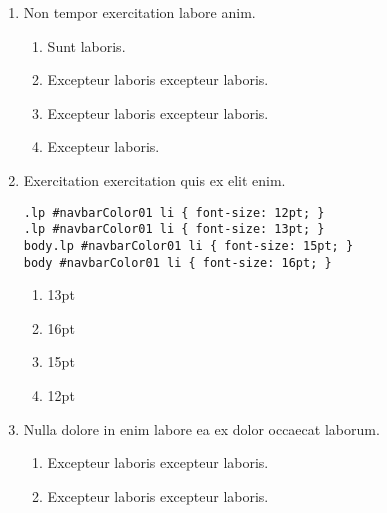 \documentclass[a4paper,12pt]{article}
\begin{document}
\begin{enumerate}[label=\textbf{\arabic*.}]
\begin{multicols}{2}
\end{multicols}
\item Non tempor exercitation labore anim.
\begin{multicols}{2}
	\begin{enumerate}
		\item  Sunt laboris.
    
		\item  Excepteur laboris excepteur laboris.
  
		\item  Excepteur laboris excepteur laboris.
    
		\item  Excepteur laboris.
    
	\end{enumerate}

\end{multicols}
\item Exercitation exercitation quis ex elit enim.
  
  \begin{minipage}{\textwidth} %
  \begin{lstlisting}
.lp #navbarColor01 li { font-size: 12pt; }
.lp #navbarColor01 li { font-size: 13pt; }
body.lp #navbarColor01 li { font-size: 15pt; }
body #navbarColor01 li { font-size: 16pt; }
  \end{lstlisting}
  \end{minipage}
\begin{multicols}{2}
	\begin{enumerate}
		\item  13pt
    
		\item  16pt
  
		\item  15pt
    
		\item  12pt
    
	\end{enumerate}

\end{multicols}
\item Nulla dolore in enim labore ea ex dolor occaecat laborum.
\begin{multicols}{2}
	\begin{enumerate}
		\item  Excepteur laboris excepteur laboris.
    
		\item  Excepteur laboris excepteur laboris.
  

\end{enumerate}
\end{multicols}
\end{enumerate}
\end{document}
